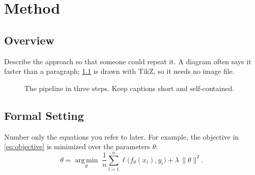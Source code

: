 \chapter{Method}\label{ch:method}

\section{Overview}
Describe the approach so that someone could repeat it. A diagram often says it faster than
a paragraph; \cref{fig:pipeline} is drawn with TikZ, so it needs no image file.

\begin{figure}[bth]
  \centering
  \caption[Short title for the list of figures]{The pipeline in three steps. Keep captions
    short and self-contained.}\label{fig:pipeline}
\end{figure}

\section{Formal Setting}
Number only the equations you refer to later. For example, the objective in
\cref{eq:objective} is minimized over the parameters $\theta$:
\begin{equation}\label{eq:objective}
  \hat{\theta} = \operatorname*{arg\,min}_{\theta}\; \frac{1}{n}\sum_{i=1}^{n} \ell\bigl(f_\theta(x_i), y_i\bigr) + \lambda\,\lVert\theta\rVert^2 .
\end{equation}
